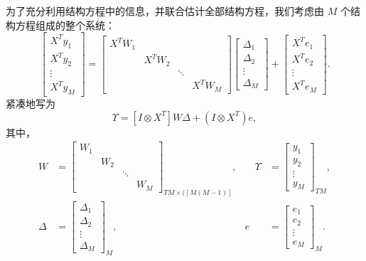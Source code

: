 为了充分利用结构方程中的信息，并联合估计全部结构方程，我们考虑由 $M$ 个结构方程组成的整个系统：
\begin{equation}
 \begin{bmatrix}X^{T}y_1\\X^{T}y_2\\\vdots\\X^{T}y_M\end{bmatrix}
 =
 \begin{bmatrix}
  X^{T}W_1&&&\\
  &X^{T}W_2&&\\
  &&\ddots&\\
  &&&X^{T}W_M
 \end{bmatrix}
 \begin{bmatrix}\Delta_1\\\Delta_2\\\vdots\\\Delta_M\end{bmatrix}
 +\begin{bmatrix}X^{T}e_1\\X^{T}e_2\\\vdots\\X^{T}e_M\end{bmatrix}.
 \tag{1.66}
\end{equation}
紧凑地写为
\begin{equation}
 [I\otimes X^{T}]\Upsilon=[I\otimes X^{T}]W\Delta+(I\otimes X^{T})e,
 \tag{1.67}
\end{equation}
其中，
\[
 \begin{aligned}
 W&=
 \begin{bmatrix}
  W_1&&&\\&W_2&&\\&&\ddots&\\&&&W_M
 \end{bmatrix}_{TM\times([M(M-1)]},
 &\quad
 \Upsilon&=
 \begin{bmatrix}y_1\\y_2\\\vdots\\y_M\end{bmatrix}_{TM},\\
 \Delta&=
 \begin{bmatrix}\Delta_1\\\Delta_2\\\vdots\\\Delta_M\end{bmatrix}_{M},
 &
 e&=
 \begin{bmatrix}e_1\\e_2\\\vdots\\e_M\end{bmatrix}_{M}.
 \end{aligned}
\]
